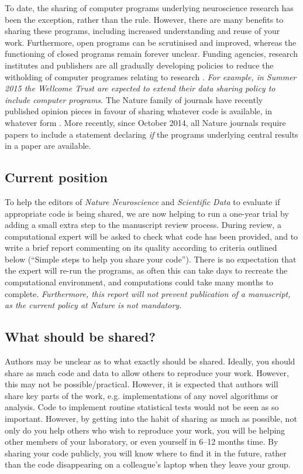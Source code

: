 \documentclass[11pt]{article}
\begin{document}
To date, the sharing of computer programs underlying neuroscience
research has been the exception, rather than the rule.  However, there
are many benefits to sharing these programs, including increased
understanding and reuse of your work.  Furthermore, open programs can
be scrutinised and improved, whereas the functioning of closed
programs remain forever unclear.  Funding agencies, research
institutes and publishers are all gradually developing policies to
reduce the witholding of computer programes relating to research
\cite{Morin2012-65e}.  \textit{For example, in Summer 2015 the Wellcome Trust
are expected to extend their data sharing policy to include computer
programs}.  The Nature family of journals have recently
published opinion pieces in favour of sharing whatever code is
available, in whatever form \cite{Barnes2010-iv,Ince2012-225}.  More
recently, since October 2014, all Nature journals require papers to
include a statement declaring \textit{if} the programs underlying central
results in a paper are available.

\subsection*{Current position}

To help the editors of \textit{Nature Neuroscience} and
\textit{Scientific Data} to evaluate if appropriate code is being
shared, we are now helping to run a one-year trial by adding a small
extra step to the manuscript review process.  During review, a
computational expert will be asked to check what code has been
provided, and to write a brief report commenting on its quality
according to criteria outlined below (``Simple steps to help you share
your code'').  There is no expectation that the expert will re-run the
programs, as often this can take days to recreate the computational
environment, and computations could take many months to complete.
\textit{Furthermore, this report will not prevent publication of a
  manuscript, as the current policy at Nature is not mandatory.}


\subsection*{What should be shared?}

Authors may be unclear as to what exactly should be shared.  Ideally,
you should share as much code and data to allow others to reproduce
your work.  However, this may not be possible/practical.  However, it
is expected that authors will share key parts of the work,
e.g. implementations of any novel algorithms or analysis.  Code to
implement routine statistical tests would not be seen as so
important.  However, by getting into the habit of sharing as much as
possible, not only do you help others who wish to reproduce your work,
you will be helping other members of your laboratory, or even yourself
in 6--12 months time.  By sharing your code publicly, you will know
where to find it in the future, rather than the code disappearing on a
colleague's laptop when they leave your group.
\end{document}
